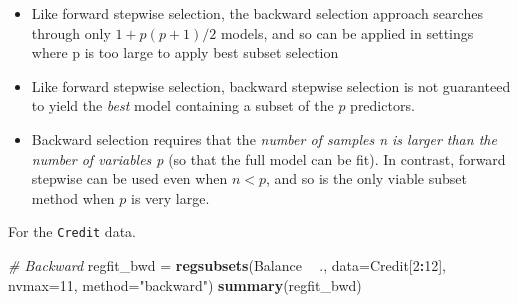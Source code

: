 \documentclass[
]{article}
\newenvironment{Shaded}{\begin{snugshade}}{\end{snugshade}}
\newcommand{\CommentTok}[1]{\textcolor[rgb]{0.56,0.35,0.01}{\textit{#1}}}
\newcommand{\DataTypeTok}[1]{\textcolor[rgb]{0.13,0.29,0.53}{#1}}
\newcommand{\DecValTok}[1]{\textcolor[rgb]{0.00,0.00,0.81}{#1}}
\newcommand{\KeywordTok}[1]{\textcolor[rgb]{0.13,0.29,0.53}{\textbf{#1}}}
\newcommand{\NormalTok}[1]{#1}
\newcommand{\OperatorTok}[1]{\textcolor[rgb]{0.81,0.36,0.00}{\textbf{#1}}}
\newcommand{\StringTok}[1]{\textcolor[rgb]{0.31,0.60,0.02}{#1}}
\providecommand{\tightlist}{%
  \setlength{\itemsep}{0pt}\setlength{\parskip}{0pt}}
\begin{document}
\begin{itemize}
\tightlist
\item
  Like forward stepwise selection, the backward selection approach
  searches through only \(1 + p(p + 1)/2\) models, and so can be applied
  in settings where p is too large to apply best subset selection
\item
  Like forward stepwise selection, backward stepwise selection is not
  guaranteed to yield the \emph{best} model containing a subset of the
  \(p\) predictors.
\item
  Backward selection requires that the \emph{number of samples n is
  larger than the number of variables p} (so that the full model can be
  fit). In contrast, forward stepwise can be used even when \(n < p\),
  and so is the only viable subset method when \(p\) is very large.
\end{itemize}

For the \texttt{Credit} data.

\begin{Shaded}
\begin{Highlighting}[]
\CommentTok{# Backward}
\NormalTok{regfit_bwd =}\StringTok{ }\KeywordTok{regsubsets}\NormalTok{(Balance }\OperatorTok{~}\StringTok{ }\NormalTok{., }\DataTypeTok{data=}\NormalTok{Credit[}\DecValTok{2}\OperatorTok{:}\DecValTok{12}\NormalTok{], }\DataTypeTok{nvmax=}\DecValTok{11}\NormalTok{, }\DataTypeTok{method=}\StringTok{"backward"}\NormalTok{)}
\KeywordTok{summary}\NormalTok{(regfit_bwd)}
\end{Highlighting}
\end{Shaded}
\end{document}
